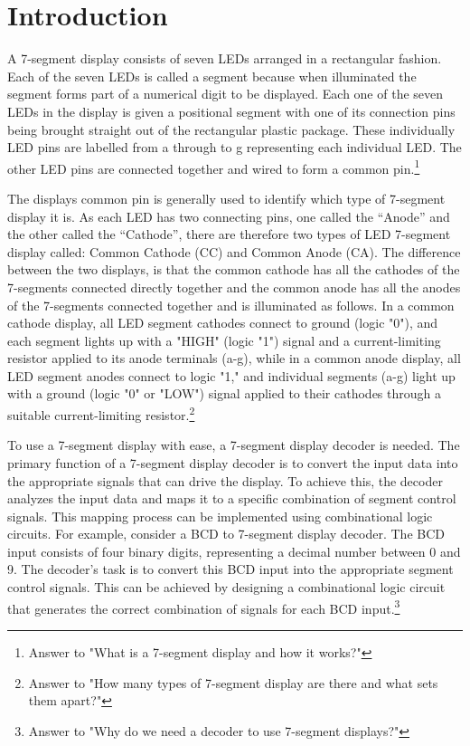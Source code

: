 \section{Introduction}

A 7-segment display consists of seven LEDs arranged in a rectangular fashion. Each of the seven LEDs is called a segment because when illuminated the segment forms part of a numerical digit to be displayed. Each one of the seven LEDs in the display is given a positional segment with one of its connection pins being brought straight out of the rectangular plastic package. These individually LED pins are labelled from a through to g representing each individual LED. The other LED pins are connected together and wired to form a common pin.\footnote{Answer to "What is a 7-segment display and how it works?"}

The displays common pin is generally used to identify which type of 7-segment display it is. As each LED has two connecting pins, one called the “Anode” and the other called the “Cathode”, there are therefore two types of LED 7-segment display called: Common Cathode (CC) and Common Anode (CA).
The difference between the two displays, is that the common cathode has all the cathodes of the 7-segments connected directly together and the common anode has all the anodes of the 7-segments connected together and is illuminated as follows. In a common cathode display, all LED segment cathodes connect to ground (logic "0"), and each segment lights up with a "HIGH" (logic "1") signal and a current-limiting resistor applied to its anode terminals (a-g), while in a common anode display, all LED segment anodes connect to logic "1," and individual segments (a-g) light up with a ground (logic "0" or "LOW") signal applied to their cathodes through a suitable current-limiting resistor.\footnote{Answer to "How many types of 7-segment display are there and what sets them apart?"}
\cite{7-segment}

To use a 7-segment display with ease, a 7-segment display decoder is needed. The primary function of a 7-segment display decoder is to convert the input data into the appropriate signals that can drive the display. To achieve this, the decoder analyzes the input data and maps it to a specific combination of segment control signals. This mapping process can be implemented using combinational logic circuits. For example, consider a BCD to 7-segment display decoder. The BCD input consists of four binary digits, representing a decimal number between 0 and 9. The decoder’s task is to convert this BCD input into the appropriate segment control signals. This can be achieved by designing a combinational logic circuit that generates the correct combination of signals for each BCD input.\footnote{Answer to "Why do we need a decoder to use 7-segment displays?"} \cite{7-segment-decoder}
